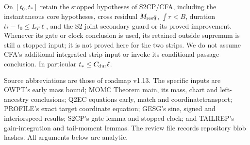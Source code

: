 \documentclass[11pt]{article}
\numberwithin{equation}{section}
\theoremstyle{remark}\newtheorem{remark}[proposition]{Remark}
\begin{document}
On $[t_0,t_*]$ retain the stopped hypotheses of S2CP/CFA, including
the instantaneous core hypotheses, cross residual $M_{\rm res}q$,
$\int r<B$, duration $t_*-t_0\le L_T\ell$, and the S2 joint secondary
guard or its proved improvement. Whenever its gate or clock conclusion
is used, its retained outside supremum is still a stopped input; it is
not proved here for the two strips. We do not assume CFA's additional
integrated strip input or invoke its conditional passage conclusion.
In particular $t_*\le C_{\rm dur}\ell$.

Source abbreviations are those of roadmap v1.13. The specific inputs
are OWPT's early mass bound; MOMC Theorem main, its mass, chart and
left-ancestry conclusions; Q2EC equations early, match and
coordinatetransport; PROFILE's exact target coordinate equation;
GESG's sine, signed and interiorspeed results; S2CP's gate lemma and
stopped clock; and TAILREP's gain-integration and tail-moment lemmas.
The review file records repository blob hashes. All arguments below
are analytic.
\end{document}
